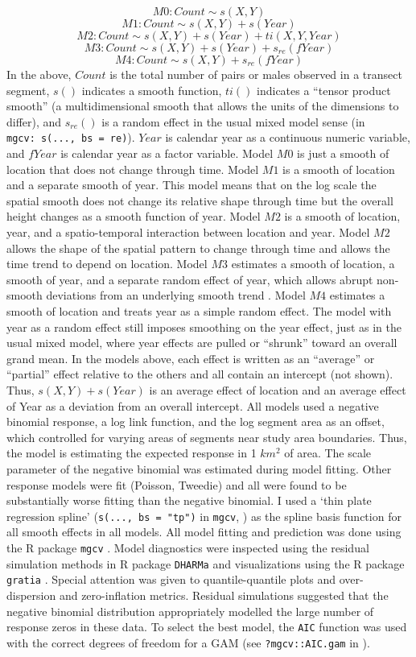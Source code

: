 \documentclass[
  10pt,
  letterpaper,
]{article}
\begin{document}
\[M0: Count \sim s(X, Y)\] \[M1: Count \sim s(X, Y) + s(Year)\]
\[M2: Count \sim s(X, Y) + s(Year) + ti(X, Y, Year)\]
\[M3: Count \sim s(X, Y) + s(Year) + s_{re}(fYear)\]
\[M4: Count \sim s(X, Y) + s_{re}(fYear)\] In the above, \(Count\) is
the total number of pairs or males observed in a transect segment,
\(s()\) indicates a smooth function, \(ti()\) indicates a ``tensor
product smooth'' (a multidimensional smooth that allows the units of the dimensions to differ), and \(s_{re}()\) is a random effect in the usual
mixed model sense (in
\texttt{mgcv:\ s(...,\ bs\ =\ \textquotesingle{}re\textquotesingle{})}).
\(Year\) is calendar year as a continuous numeric variable, and
\(fYear\) is calendar year as a factor variable. Model \(M0\) is just a
smooth of location that does not change through time. Model \(M1\) is a
smooth of location and a separate smooth of year. This model means that
on the log scale the spatial smooth does not change its relative shape
through time but the overall height changes as a smooth function of
year. Model \(M2\) is a smooth of location, year, and a spatio-temporal
interaction between location and year. Model \(M2\) allows the shape of
the spatial pattern to change through time and allows the time trend to
depend on location. Model \(M3\) estimates a smooth of location, a
smooth of year, and a separate random effect of year, which allows
abrupt non-smooth deviations from an underlying smooth trend
\citep{smith2021north}. Model \(M4\) estimates a smooth of location and
treats year as a simple random effect. The model with year as a random
effect still imposes smoothing on the year effect, just as in the usual
mixed model, where year effects are pulled or ``shrunk'' toward an
overall grand mean. In the models above, each effect is written as an
``average'' or ``partial'' effect relative to the others and all contain
an intercept (not shown). Thus, \(s(X,Y) + s(Year)\) is an average
effect of location and an average effect of Year as a deviation from an
overall intercept. All models used a negative binomial response, a log
link function, and the log segment area as an offset, which controlled
for varying areas of segments near study area boundaries. Thus, the
model is estimating the expected response in 1 \(km^2\) of area. The
scale parameter of the negative binomial was estimated during model
fitting. Other response models were fit (Poisson, Tweedie) and all were
found to be substantially worse fitting than the negative binomial. I
used a `thin plate regression spline' (\texttt{s(...,\ bs\ =\ "tp")}
in \texttt{mgcv}, \citep{r-mgcv}) as the spline basis function for all
smooth effects in all models. All model fitting and prediction was done
using the R package \texttt{mgcv} \citep{r-mgcv}. Model diagnostics were
inspected using the residual simulation methods in R package
\texttt{DHARMa} \citep{DHARMa} and visualizations using the R package
\texttt{gratia} \citep{r-gratia}. Special attention was given to
quantile-quantile plots and over-dispersion and zero-inflation metrics.
Residual simulations suggested that the negative binomial distribution
appropriately modelled the large number of response zeros in these data.
To select the best model, the \texttt{AIC} function was used with the correct degrees of freedom for a GAM (see \texttt{?mgcv::AIC.gam} in \citep{r-mgcv}).
\end{document}
